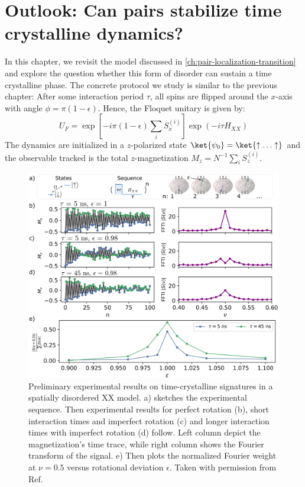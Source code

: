 \chapter{Outlook: Can pairs stabilize time crystalline dynamics?}
\label{ch:rydberg-timecrystal}

In this chapter, we revisit the model discussed in \autoref{ch:pair-localization-transition} and explore the question whether this form of disorder can sustain a time crystalline phase. The concrete protocol we study is similar to the previous chapter: After some interaction period $\tau$, all spins are flipped around the $x$-axis with angle $\phi=\pi(1-\epsilon)$. Hence, the Floquet unitary is given by:
\begin{equation}
	U_F = \exp\left[-i\pi(1-\epsilon)\sum_i S_x^{(i)}\right]\exp(-i\tau H_{XX})
\end{equation}
The dynamics are initialized in a $z$-polarized state $\ket{\psi_0} = \ket{\uparrow\ldots\uparrow}$ and the observable tracked is the total $z$-magnetization $M_z = N^{-1} \sum_i S_z^{(i)}$.

\begin{figure}[htb]
	\centering
	\includegraphics[width=\textwidth]{gfx/preliminary-timecrystal.png}
	\caption{Preliminary experimental results on time-crystalline signatures in a spatially disordered XX model. a) sketches the experimental sequence. Then experimental results for perfect rotation (b), short interaction times and imperfect rotation (c) and longer interaction times with imperfect rotation (d) follow. Left column depict the magnetization's time trace, while right column shows the Fourier transform of the signal. e) Then plots the normalized Fourier weight at $\nu=0.5$ versus rotational deviation $\epsilon$. Taken with permission from Ref.~\cite{geierShapingHamiltonianManybody}}
	\label{fig:rydberg-timecrystal-experiment}
\end{figure}

